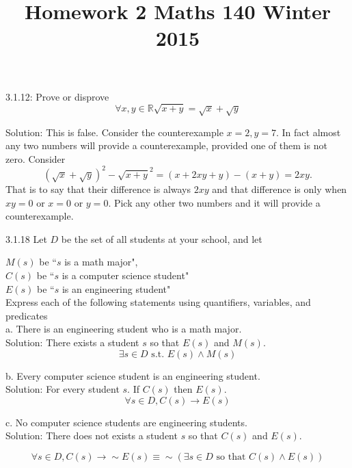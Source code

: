 \documentclass[16 pt]{amsart}
\theoremstyle{definition}
\theoremstyle{remark}
\numberwithin{equation}{subsection}
\begin{document}
\title{Homework 2 Maths 140 Winter 2015}
\maketitle 

3.1.12: Prove or disprove
\[
 \forall x,y \in \mathbb{R} \sqrt{x+y} = \sqrt{x} + \sqrt{y}
\]

\vspace{1in}

Solution: This is false.  Consider the counterexample $x=2, y=7.$  In fact almost any two numbers will provide a counterexample, provided one of them is not zero. Consider
\[
(\sqrt{x}+\sqrt{y})^2 - \sqrt{x+y}^2= (x + 2xy + y) - (x+y) = 2xy.
\]
That is to say that their difference is always $2xy$ and that difference is only when $xy=0$ or $x=0$ or $y=0$.  Pick any other two numbers and it will provide a counterexample.


\newpage

3.1.18 Let $D$ be the set of all students at your school, and let 

$M(s)$ be ``$s$ is a math major",\\

$C(s)$ be ``$s$ is a computer science student"\\

$E(s)$ be ``$s$ is an engineering student"\\

Express each of the following statements using quantifiers, variables, and predicates\\

a. There is an engineering student who is a math major.\\

Solution: There exists a student $s$ so that $E(s)$ and $M(s)$.  
\[
\exists s \in D \text{ s.t. } E(s)\wedge M(s)
\]

b. Every computer science student is an engineering student.\\

Solution: For every student $s$.  If $C(s)$ then $E(s)$.
\[
\forall s\in D, C(s)\rightarrow E(s)
\]


c. No computer science students are engineering students.\\

Solution: There does not exists a student $s$ so that $C(s)$ and $E(s)$.

\[
\forall s\in D, C(s) \rightarrow \sim E(s) \equiv \sim(\exists s \in D \text{ so that } C(s)\wedge E(s))
\]
\end{document}
